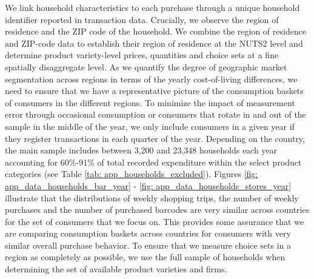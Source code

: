 We link household characteristics to each purchase through a unique household identifier reported in transaction data. Crucially, we observe the region of residence and the ZIP code of the household. We combine the region of residence and ZIP-code data to establish their region of residence at the NUTS2 level and determine product variety-level prices, quantities and choice sets at a fine spatially disaggregate level. As we quantify the degree of geographic market segmentation across regions in terms of the yearly cost-of-living differences, we need to ensure that we have a representative picture of the consumption baskets of consumers in the different regions. To minimize the impact of measurement error through occasional consumption or consumers that rotate in and out of the sample in the middle of the year, we only include consumers in a given year if they register transactions in each quarter of the year. Depending on the country, the main sample includes between 3,200 and 23,348 households each year accounting for 60\%-91\% of total recorded expenditure within the select product categories (see Table \ref{tab: app_households_excluded}). Figures \ref{fig: app_data_households_bar_year} - \ref{fig: app_data_households_stores_year} illustrate that the distributions of weekly shopping trips, the number of weekly purchases and the number of purchased barcodes are very similar across countries for the set of consumers that we focus on. This provides some assurance that we are comparing consumption baskets across countries for consumers with very similar overall purchase behavior. To ensure that we measure choice sets in a region as completely as possible, we use the full sample of households when determining the set of available product varieties and firms. 

